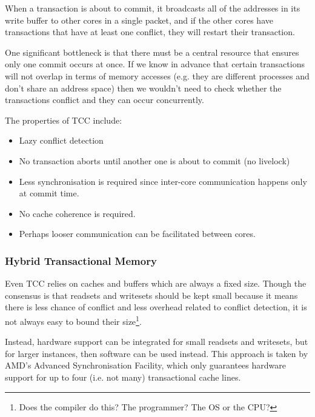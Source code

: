 When a transaction is about to commit, it broadcasts all of the
addresses in its write buffer to other cores in a single packet, and
if the other cores have transactions that have at least one conflict,
they will restart their transaction.


One significant bottleneck is that there must be a central resource
that ensures only one commit occurs at once. If we know in advance
that certain transactions will not overlap in terms of memory accesses
(e.g. they are different processes and don't share an address space)
then we wouldn't need to check whether the transactions conflict and
they can occur concurrently.

The properties of TCC include:

\begin{itemize}
\item Lazy conflict detection
\item No transaction aborts until another one is about to commit (no livelock)
\item Less synchronisation is required since inter-core communication
happens only at commit time.
\item No cache coherence is required.
\item Perhaps looser communication can be facilitated between cores.
\end{itemize}

\subsubsection{Hybrid Transactional Memory}

Even TCC relies on caches and buffers which are always a fixed
size. Though the consensus is that readsets and writesets should be
kept small because it means there is less chance of conflict and less
overhead related to conflict detection, it is not always easy to bound
their size\footnote{Does the compiler do this? The programmer? The OS
or the CPU?}.

Instead, hardware support can be integrated for small readsets and
writesets, but for larger instances, then software can be used
instead. This approach is taken by AMD's Advanced Synchronisation
Facility, which only guarantees hardware support for up to four
(i.e. not many) transactional cache lines.

